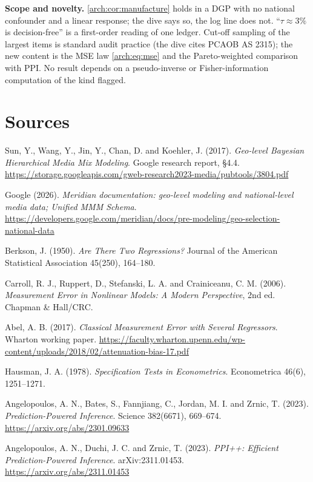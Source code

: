 \begin{reviewernote}[(compiler)]
\textbf{Scope and novelty.} \cref{arch:cor:manufacture} holds in a DGP with no national confounder and a linear response; the dive says so, the log line does not. ``$\tau \approx 3\%$ is decision-free'' is a first-order reading of one ledger. Cut-off sampling of the largest items is standard audit practice (the dive cites PCAOB AS 2315); the new content is the MSE law \cref{arch:eq:mse} and the Pareto-weighted comparison with PPI. No result depends on a pseudo-inverse or Fisher-information computation of the kind  flagged.
\end{reviewernote}

\section*{Sources}
\begingroup\raggedright
\begin{enumerate}[label={[\arabic*]},leftmargin=2.5em]
\item Sun, Y., Wang, Y., Jin, Y., Chan, D. and Koehler, J. (2017). \emph{Geo-level Bayesian Hierarchical Media Mix Modeling}. Google research report, \S4.4. \url{https://storage.googleapis.com/gweb-research2023-media/pubtools/3804.pdf}
\item Google (2026). \emph{Meridian documentation: geo-level modeling and national-level media data; Unified MMM Schema}. \url{https://developers.google.com/meridian/docs/pre-modeling/geo-selection-national-data}
\item Berkson, J. (1950). \emph{Are There Two Regressions?} Journal of the American Statistical Association 45(250), 164--180.
\item Carroll, R. J., Ruppert, D., Stefanski, L. A. and Crainiceanu, C. M. (2006). \emph{Measurement Error in Nonlinear Models: A Modern Perspective}, 2nd ed. Chapman \& Hall/CRC.
\item Abel, A. B. (2017). \emph{Classical Measurement Error with Several Regressors}. Wharton working paper. \url{https://faculty.wharton.upenn.edu/wp-content/uploads/2018/02/attenuation-bias-17.pdf}
\item Hausman, J. A. (1978). \emph{Specification Tests in Econometrics}. Econometrica 46(6), 1251--1271.
\item Angelopoulos, A. N., Bates, S., Fannjiang, C., Jordan, M. I. and Zrnic, T. (2023). \emph{Prediction-Powered Inference}. Science 382(6671), 669--674. \url{https://arxiv.org/abs/2301.09633}
\item Angelopoulos, A. N., Duchi, J. C. and Zrnic, T. (2023). \emph{PPI++: Efficient Prediction-Powered Inference}. arXiv:2311.01453. \url{https://arxiv.org/abs/2311.01453}

\end{enumerate}

